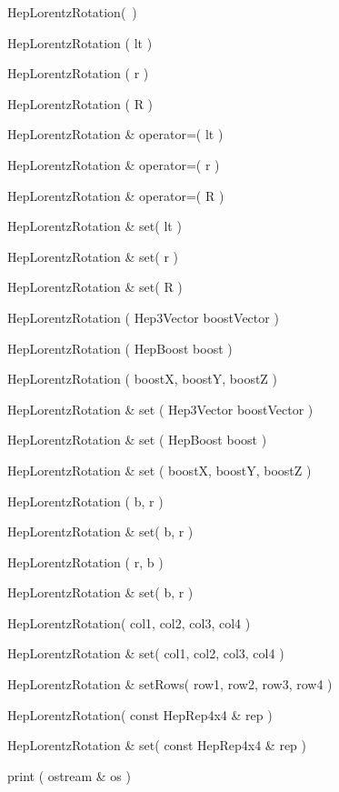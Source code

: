 \begin{shortlist}
  \item HepLorentzRotation(~)

  \item HepLorentzRotation ( lt )
  \item HepLorentzRotation ( r )
  \item HepLorentzRotation ( R )
  \item HepLorentzRotation \& operator=( lt )
  \item HepLorentzRotation \& operator=( r )
  \item HepLorentzRotation \& operator=( R )
  \item HepLorentzRotation \& set( lt )
  \item HepLorentzRotation \& set( r )
  \item HepLorentzRotation \& set( R )


  \item HepLorentzRotation ( Hep3Vector boostVector )
  \item HepLorentzRotation ( HepBoost   boost )
  \item HepLorentzRotation ( boostX, boostY, boostZ )
  \item HepLorentzRotation \& set ( Hep3Vector boostVector )
  \item HepLorentzRotation \& set ( HepBoost   boost )
  \item HepLorentzRotation \& set ( boostX, boostY, boostZ )

  \item HepLorentzRotation ( b, r )			\see{\ref{eq:decomBR}}
  \item HepLorentzRotation \& set( b, r )		
  \item HepLorentzRotation ( r, b )			\see{\ref{eq:decomRB}}
  \item HepLorentzRotation \& set( b, r )		

  \item HepLorentzRotation( col1, col2, col3, col4 )  
  \item HepLorentzRotation \& set( col1, col2, col3, col4 )  
  \item HepLorentzRotation \& setRows( row1, row2, row3, row4 )  

  \item HepLorentzRotation( const HepRep4x4 \& rep )
  \item HepLorentzRotation \& set( const HepRep4x4 \& rep )

 \item print ( ostream \& os ) 

\end{shortlist}

